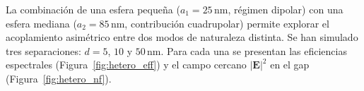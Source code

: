 

La combinación de una esfera pequeña ($a_1=25\,\text{nm}$, régimen dipolar) con
una esfera mediana ($a_2=85\,\text{nm}$, contribución cuadrupolar) permite
explorar el acoplamiento asimétrico entre dos modos de naturaleza distinta. Se
han simulado tres separaciones: $d=5$, $10$ y $50\,\text{nm}$. Para cada una se
presentan las eficiencias espectrales (Figura~\ref{fig:hetero_eff}) y el campo
cercano $|\mathbf{E}|^2$ en el gap (Figura~\ref{fig:hetero_nf}).

